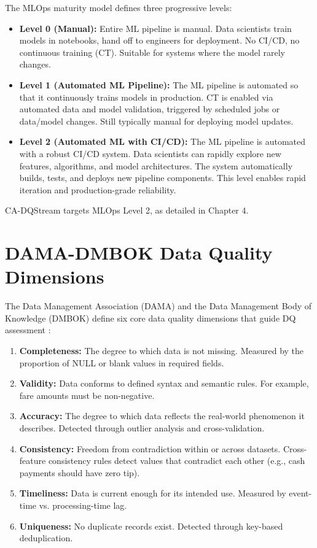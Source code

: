 The MLOps maturity model \citep{googlemlops2024} defines three progressive levels:

\begin{itemize}
    \item \textbf{Level 0 (Manual):} Entire ML pipeline is manual. Data scientists train models in notebooks, hand off to engineers for deployment. No CI/CD, no continuous training (CT). Suitable for systems where the model rarely changes.
    \item \textbf{Level 1 (Automated ML Pipeline):} The ML pipeline is automated so that it continuously trains models in production. CT is enabled via automated data and model validation, triggered by scheduled jobs or data/model changes. Still typically manual for deploying model updates.
    \item \textbf{Level 2 (Automated ML with CI/CD):} The ML pipeline is automated with a robust CI/CD system. Data scientists can rapidly explore new features, algorithms, and model architectures. The system automatically builds, tests, and deploys new pipeline components. This level enables rapid iteration and production-grade reliability.
\end{itemize}

CA-DQStream targets MLOps Level 2, as detailed in Chapter 4.

\section{DAMA-DMBOK Data Quality Dimensions}

The Data Management Association (DAMA) and the Data Management Body of Knowledge (DMBOK) define six core data quality dimensions that guide DQ assessment \citep{dama2017dmbok}:

\begin{enumerate}
    \item \textbf{Completeness:} The degree to which data is not missing. Measured by the proportion of NULL or blank values in required fields.
    \item \textbf{Validity:} Data conforms to defined syntax and semantic rules. For example, fare amounts must be non-negative.
    \item \textbf{Accuracy:} The degree to which data reflects the real-world phenomenon it describes. Detected through outlier analysis and cross-validation.
    \item \textbf{Consistency:} Freedom from contradiction within or across datasets. Cross-feature consistency rules detect values that contradict each other (e.g., cash payments should have zero tip).
    \item \textbf{Timeliness:} Data is current enough for its intended use. Measured by event-time vs. processing-time lag.
    \item \textbf{Uniqueness:} No duplicate records exist. Detected through key-based deduplication.
\end{enumerate}

